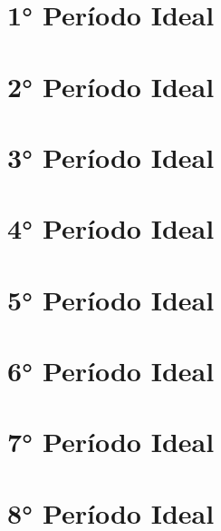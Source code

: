 \documentclass[a4paper, notoc]{tufte-book}
\begin{document}
\mainmatter


\part{1° Período Ideal}

\part{2° Período Ideal}







\part{3° Período Ideal}



\part{4° Período Ideal}

\part{5° Período Ideal}

\part{6° Período Ideal}

\part{7° Período Ideal}

\part{8° Período Ideal}
\end{document}
